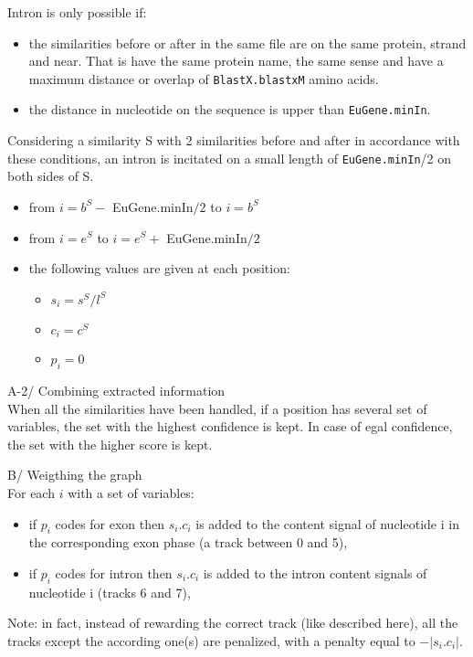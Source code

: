 Intron is only possible if:
\begin{itemize}
\item the similarities before or after in the same file are on the
  same protein, strand and near. That is have the same protein name,
  the same sense and have a maximum distance or overlap of
  \texttt{BlastX.blastxM} amino acids.
\item the distance in nucleotide on the sequence is upper than
  \texttt{EuGene.minIn}.
\end{itemize}
Considering a similarity S with 2 similarities before and after in
accordance with these conditions, an intron is incitated on a small
length of \texttt{EuGene.minIn}/2 on both sides of S.
\begin{itemize}
\item from $i = b^S -$ EuGene.minIn$/2$ to $i = b^S$ 
\item from $i = e^S$ to $i = e^S +$ EuGene.minIn$/2$ 
\item the following values are given at each position:
  \begin{itemize}
  \item $s_i = s^S / l^S$ 
  \item $c_i = c^S$ 
  \item $p_i = 0$
  \end{itemize}
\end{itemize}

A-2/ Combining extracted information\\

When all the similarities have been handled, if a position has several
set of variables, the set with the highest confidence is kept. In
case of egal confidence, the set with the higher score is kept.

B/ Weigthing the graph\\

For each $i$ with a set of variables:
\begin{itemize}
\item if $p_i$ codes for exon then $s_i .c_i$ is added to the content
  signal of nucleotide i in the corresponding exon phase (a track
  between 0 and 5),
\item if $p_i$ codes for intron then $s_i .c_i$ is added to the intron
  content signals of nucleotide i (tracks 6 and 7),
\end{itemize}

Note: in fact, instead of rewarding the correct track (like described
here), all the tracks except the according one(s) are penalized, with
a penalty equal to $-|s_i .c_i|$.

